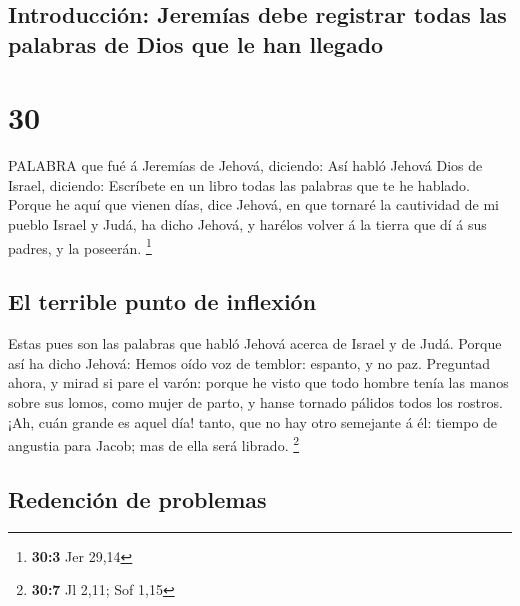 \hypertarget{introducciuxf3n-jeremuxedas-debe-registrar-todas-las-palabras-de-dios-que-le-han-llegado}{%
\subsection{Introducción: Jeremías debe registrar todas las palabras de
Dios que le han
llegado}\label{introducciuxf3n-jeremuxedas-debe-registrar-todas-las-palabras-de-dios-que-le-han-llegado}}

\hypertarget{section-29}{%
\section{30}\label{section-29}}

 PALABRA que fué á Jeremías de Jehová, diciendo:
 Así habló Jehová Dios de Israel, diciendo: Escríbete en un
libro todas las palabras que te he hablado.  Porque he aquí
que vienen días, dice Jehová, en que tornaré la cautividad de mi pueblo
Israel y Judá, ha dicho Jehová, y harélos volver á la tierra que dí á
sus padres, y la poseerán. \footnote{\textbf{30:3} Jer 29,14}

\hypertarget{el-terrible-punto-de-inflexiuxf3n}{%
\subsection{El terrible punto de
inflexión}\label{el-terrible-punto-de-inflexiuxf3n}}

 Estas pues son las palabras que habló Jehová acerca de
Israel y de Judá.  Porque así ha dicho Jehová: Hemos oído
voz de temblor: espanto, y no paz.  Preguntad ahora, y mirad
si pare el varón: porque he visto que todo hombre tenía las manos sobre
sus lomos, como mujer de parto, y hanse tornado pálidos todos los
rostros.  ¡Ah, cuán grande es aquel día! tanto, que no hay
otro semejante á él: tiempo de angustia para Jacob; mas de ella será
librado. \footnote{\textbf{30:7} Jl 2,11; Sof 1,15}

\hypertarget{redenciuxf3n-de-problemas}{%
\subsection{Redención de problemas}\label{redenciuxf3n-de-problemas}}

